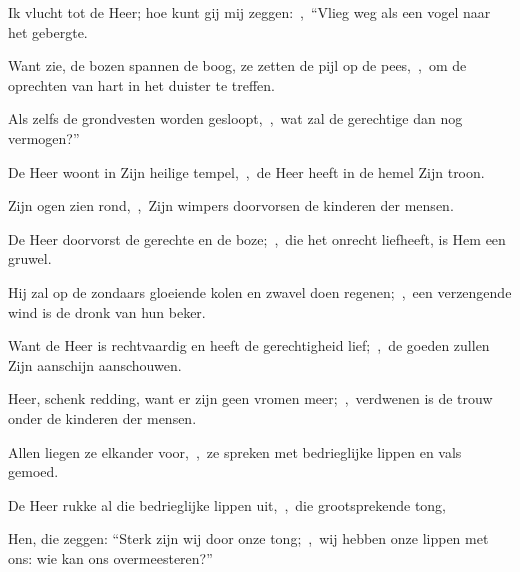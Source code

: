 \documentclass[12pt,twoside,a5paper]{article}
\begin{document}






\begin{halfparskip}
  Ik vlucht tot de Heer; hoe kunt gij mij zeggen:~\sep\ ``Vlieg weg als een vogel naar het gebergte.


  Want zie, de bozen spannen de boog, ze zetten de pijl op de pees,~\sep\ om de oprechten van hart in het duister te treffen.

  Als zelfs de grondvesten worden gesloopt,~\sep\ wat zal de gerechtige dan nog vermogen?''
\end{halfparskip}


\begin{halfparskip}
  De Heer woont in Zijn heilige tempel,~\sep\ de Heer heeft in de hemel Zijn troon.

  Zijn ogen zien rond,~\sep\ Zijn wimpers doorvorsen de kinderen der mensen.

  De Heer doorvorst de gerechte en de boze;~\sep\ die het onrecht liefheeft, is Hem een gruwel.

  Hij zal op de zondaars gloeiende kolen en zwavel doen regenen;~\sep\ een verzengende wind is de dronk van hun beker.

  Want de Heer is rechtvaardig en heeft de gerechtigheid lief;~\sep\ de goeden zullen Zijn aanschijn aanschouwen.
\end{halfparskip}



\begin{halfparskip}
  Heer, schenk redding, want er zijn geen vromen meer;~\sep\ verdwenen is de trouw onder de kinderen der mensen.


  Allen liegen ze elkander voor,~\sep\ ze spreken met bedrieglijke lippen en vals gemoed.

  De Heer rukke al die bedrieglijke lippen uit,~\sep\ die grootsprekende tong,

  Hen, die zeggen: ``Sterk zijn wij door onze tong;~\sep\ wij hebben onze lippen met ons: wie kan ons overmeesteren?''
\end{halfparskip}
\end{document}
